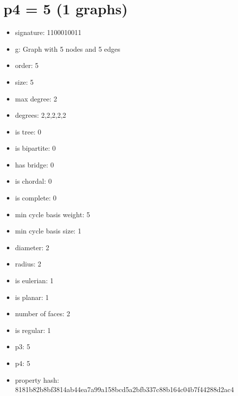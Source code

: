 \chapter{p4 = 5 (1 graphs)}
\newpage\begin{figure}
\end{figure}
\begin{itemize}
\item signature: 1100010011
\item g: Graph with 5 nodes and 5 edges
\item order: 5
\item size: 5
\item max degree: 2
\item degrees: 2,2,2,2,2
\item is tree: 0
\item is bipartite: 0
\item has bridge: 0
\item is chordal: 0
\item is complete: 0
\item min cycle basis weight: 5
\item min cycle basis size: 1
\item diameter: 2
\item radius: 2
\item is eulerian: 1
\item is planar: 1
\item number of faces: 2
\item is regular: 1
\item p3: 5
\item p4: 5
\item property hash: 8181b82b8bf3814ab44ea7a99a158bcd5a2bfb337c88b164c04b7f44288d2ac4
\end{itemize}
\newpage
